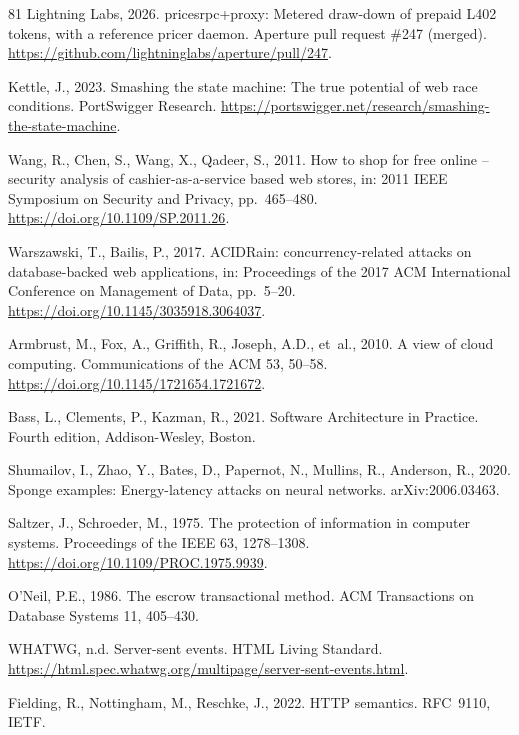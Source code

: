 \documentclass[final,5p,times,twocolumn,number]{elsarticle}
\begin{document}
\begin{thebibliography}{81}
Lightning Labs, 2026. pricesrpc+proxy: Metered draw-down of prepaid L402 tokens, with a
reference pricer daemon. Aperture pull request \#247 (merged).
\url{https://github.com/lightninglabs/aperture/pull/247}.

Kettle, J., 2023. Smashing the state machine: The true potential of web race
conditions. PortSwigger Research.
\url{https://portswigger.net/research/smashing-the-state-machine}.

Wang, R., Chen, S., Wang, X., Qadeer, S., 2011. How to shop for free online -- security analysis of cashier-as-a-service based web stores, in: 2011 IEEE Symposium on Security and Privacy, pp.~465--480. \url{https://doi.org/10.1109/SP.2011.26}.

Warszawski, T., Bailis, P., 2017. ACIDRain: concurrency-related attacks on database-backed web applications, in: Proceedings of the 2017 ACM International Conference on Management of Data, pp.~5--20. \url{https://doi.org/10.1145/3035918.3064037}.

Armbrust, M., Fox, A., Griffith, R., Joseph, A.D., et~al., 2010. A view of cloud computing. Communications of the ACM 53, 50--58. \url{https://doi.org/10.1145/1721654.1721672}.

Bass, L., Clements, P., Kazman, R., 2021. Software Architecture in Practice. Fourth edition, Addison-Wesley, Boston.

Shumailov, I., Zhao, Y., Bates, D., Papernot, N., Mullins, R., Anderson, R., 2020.
Sponge examples: Energy-latency attacks on neural networks. arXiv:2006.03463.

Saltzer, J., Schroeder, M., 1975. The protection of information in computer systems. Proceedings of the IEEE 63, 1278--1308. \url{https://doi.org/10.1109/PROC.1975.9939}.

O'Neil, P.E., 1986. The escrow transactional method. ACM Transactions on Database
Systems 11, 405--430.

WHATWG, n.d. Server-sent events. HTML Living Standard.
\url{https://html.spec.whatwg.org/multipage/server-sent-events.html}.

Fielding, R., Nottingham, M., Reschke, J., 2022. HTTP semantics. RFC~9110, IETF.


\end{thebibliography}
\end{document}
